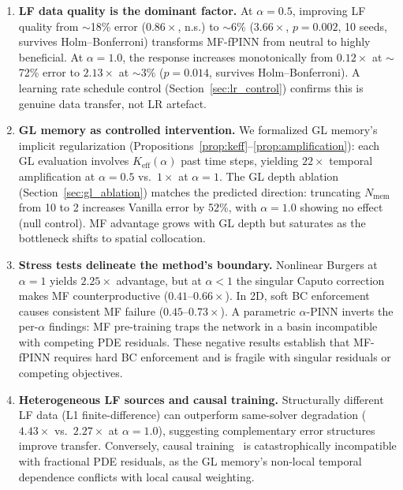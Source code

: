 \documentclass[preprint,12pt]{elsarticle}
\begin{document}
\begin{enumerate}
    \item \textbf{LF data quality is the dominant factor.} At $\alpha = 0.5$, improving LF quality from $\sim$18\% error ($0.86\times$, n.s.) to $\sim$6\% ($3.66\times$, $p = 0.002$, 10 seeds, survives Holm--Bonferroni) transforms MF-fPINN from neutral to highly beneficial. At $\alpha = 1.0$, the response increases monotonically from $0.12\times$ at $\sim$72\% error to $2.13\times$ at $\sim$3\% ($p = 0.014$, survives Holm--Bonferroni). A learning rate schedule control (Section~\ref{sec:lr_control}) confirms this is genuine data transfer, not LR artefact.

    \item \textbf{GL memory as controlled intervention.} We formalized GL memory's implicit regularization (Propositions~\ref{prop:keff}--\ref{prop:amplification}): each GL evaluation involves $K_{\mathrm{eff}}(\alpha)$ past time steps, yielding $22\times$ temporal amplification at $\alpha = 0.5$ vs.\ $1\times$ at $\alpha = 1$. The GL depth ablation (Section~\ref{sec:gl_ablation}) matches the predicted direction: truncating $N_{\mathrm{mem}}$ from 10 to 2 increases Vanilla error by 52\%, with $\alpha = 1.0$ showing no effect (null control). MF advantage grows with GL depth but saturates as the bottleneck shifts to spatial collocation.

    \item \textbf{Stress tests delineate the method's boundary.} Nonlinear Burgers at $\alpha = 1$ yields $2.25\times$ advantage, but at $\alpha < 1$ the singular Caputo correction makes MF counterproductive ($0.41$--$0.66\times$). In 2D, soft BC enforcement causes consistent MF failure ($0.45$--$0.73\times$). A parametric $\alpha$-PINN inverts the per-$\alpha$ findings: MF pre-training traps the network in a basin incompatible with competing PDE residuals. These negative results establish that MF-fPINN requires hard BC enforcement and is fragile with singular residuals or competing objectives.

    \item \textbf{Heterogeneous LF sources and causal training.} Structurally different LF data (L1 finite-difference) can outperform same-solver degradation ($4.43\times$ vs.\ $2.27\times$ at $\alpha = 1.0$), suggesting complementary error structures improve transfer. Conversely, causal training~\cite{wang2022respecting} is catastrophically incompatible with fractional PDE residuals, as the GL memory's non-local temporal dependence conflicts with local causal weighting.
\end{enumerate}
\end{document}

